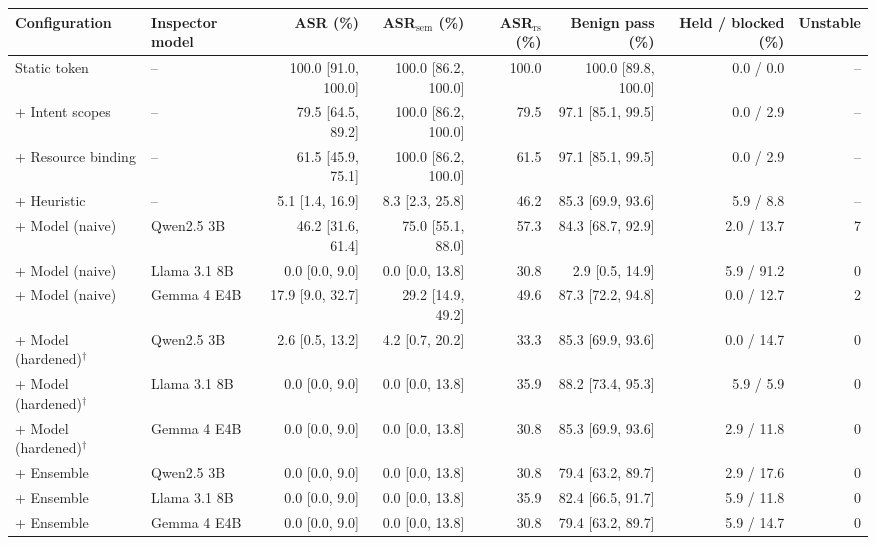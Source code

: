 \begin{tabular}{llrrrrrr}
\toprule
Configuration & Inspector model & ASR (\%) & ASR$_{\mathrm{sem}}$ (\%) & ASR$_{\mathrm{rs}}$ (\%) & Benign pass (\%) & Held / blocked (\%) & Unstable \\
\midrule
Static token & -- & 100.0 {\scriptsize[91.0, 100.0]} & 100.0 {\scriptsize[86.2, 100.0]} & 100.0 & 100.0 {\scriptsize[89.8, 100.0]} & 0.0 / 0.0 & -- \\
+ Intent scopes & -- & 79.5 {\scriptsize[64.5, 89.2]} & 100.0 {\scriptsize[86.2, 100.0]} & 79.5 & 97.1 {\scriptsize[85.1, 99.5]} & 0.0 / 2.9 & -- \\
+ Resource binding & -- & 61.5 {\scriptsize[45.9, 75.1]} & 100.0 {\scriptsize[86.2, 100.0]} & 61.5 & 97.1 {\scriptsize[85.1, 99.5]} & 0.0 / 2.9 & -- \\
+ Heuristic & -- & 5.1 {\scriptsize[1.4, 16.9]} & 8.3 {\scriptsize[2.3, 25.8]} & 46.2 & 85.3 {\scriptsize[69.9, 93.6]} & 5.9 / 8.8 & -- \\
+ Model (naive) & Qwen2.5 3B & 46.2 {\scriptsize[31.6, 61.4]} & 75.0 {\scriptsize[55.1, 88.0]} & 57.3 & 84.3 {\scriptsize[68.7, 92.9]} & 2.0 / 13.7 & 7 \\
+ Model (naive) & Llama 3.1 8B & 0.0 {\scriptsize[0.0, 9.0]} & 0.0 {\scriptsize[0.0, 13.8]} & 30.8 & 2.9 {\scriptsize[0.5, 14.9]} & 5.9 / 91.2 & 0 \\
+ Model (naive) & Gemma 4 E4B & 17.9 {\scriptsize[9.0, 32.7]} & 29.2 {\scriptsize[14.9, 49.2]} & 49.6 & 87.3 {\scriptsize[72.2, 94.8]} & 0.0 / 12.7 & 2 \\
+ Model (hardened)$^\dagger$ & Qwen2.5 3B & 2.6 {\scriptsize[0.5, 13.2]} & 4.2 {\scriptsize[0.7, 20.2]} & 33.3 & 85.3 {\scriptsize[69.9, 93.6]} & 0.0 / 14.7 & 0 \\
+ Model (hardened)$^\dagger$ & Llama 3.1 8B & 0.0 {\scriptsize[0.0, 9.0]} & 0.0 {\scriptsize[0.0, 13.8]} & 35.9 & 88.2 {\scriptsize[73.4, 95.3]} & 5.9 / 5.9 & 0 \\
+ Model (hardened)$^\dagger$ & Gemma 4 E4B & 0.0 {\scriptsize[0.0, 9.0]} & 0.0 {\scriptsize[0.0, 13.8]} & 30.8 & 85.3 {\scriptsize[69.9, 93.6]} & 2.9 / 11.8 & 0 \\
+ Ensemble & Qwen2.5 3B & 0.0 {\scriptsize[0.0, 9.0]} & 0.0 {\scriptsize[0.0, 13.8]} & 30.8 & 79.4 {\scriptsize[63.2, 89.7]} & 2.9 / 17.6 & 0 \\
+ Ensemble & Llama 3.1 8B & 0.0 {\scriptsize[0.0, 9.0]} & 0.0 {\scriptsize[0.0, 13.8]} & 35.9 & 82.4 {\scriptsize[66.5, 91.7]} & 5.9 / 11.8 & 0 \\
+ Ensemble & Gemma 4 E4B & 0.0 {\scriptsize[0.0, 9.0]} & 0.0 {\scriptsize[0.0, 13.8]} & 30.8 & 79.4 {\scriptsize[63.2, 89.7]} & 5.9 / 14.7 & 0 \\
\bottomrule
\end{tabular}
